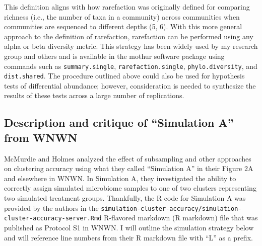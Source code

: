 \documentclass[
]{article}
\begin{document}
This definition aligns with how rarefaction was originally defined for
comparing richness (i.e., the number of taxa in a community) across
communities when communities are sequenced to different depths (5, 6).
With this more general approach to the definition of rarefaction,
rarefaction can be performed using any alpha or beta diversity metric.
This strategy has been widely used by my research group and others and
is available in the mothur software package using commands such as
\texttt{summary.single}, \texttt{rarefaction.single},
\texttt{phylo.diversity}, and \texttt{dist.shared}. The procedure
outlined above could also be used for hypothesis tests of differential
abundance; however, consideration is needed to synthesize the results of
these tests across a large number of replications.

\hypertarget{description-and-critique-of-simulation-a-from-wnwn}{%
\subsection{Description and critique of ``Simulation A'' from
WNWN}\label{description-and-critique-of-simulation-a-from-wnwn}}

McMurdie and Holmes analyzed the effect of subsampling and other
approaches on clustering accuracy using what they called ``Simulation
A'' in their Figure 2A and elsewhere in WNWN. In Simulation A, they
investigated the ability to correctly assign simulated microbiome
samples to one of two clusters representing two simulated treatment
groups. Thankfully, the R code for Simulation A was provided by the
authors in the
\texttt{simulation-cluster-accuracy/simulation-cluster-accuracy-server.Rmd}
R-flavored markdown (R markdown) file that was published as Protocol S1
in WNWN. I will outline the simulation strategy below and will reference
line numbers from their R markdown file with ``L'' as a prefix.
\end{document}
